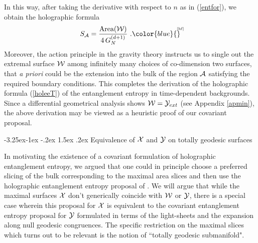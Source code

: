 \documentclass[12pt]{article}
\makeatletter
\renewcommand\subsection{\@startsection{subsection}{2}{\z@}%
                                     {-3.25ex\@plus -1ex \@minus -.2ex}%
                                     {1.5ex \@plus .2ex}%
                                     {\normalfont\bfseries}}
\newcommand{\be}{\begin{equation}}
\newcommand{\ee}{\end{equation}}
\def\req#1{(\ref{#1})}
\def\App#1{Appendix \ref{#1}}
\def\CA{{\cal A}}
\def\CW{{\cal W}}
\def\CX{{\cal X}}
\def\CY{{\cal Y}}
\def\f#1#2{{\frac{#1}{#2}}}
\def\f#1#2{{\frac{#1}{#2}}}
\def\Label#1{\label{#1}%
{ \color{blue}{\smash{\hbox to0pt{\raise2ex\hbox{\tiny[#1]}\hss}}}}}
\def\Gms{\CW}
\def\Lms{\CY}
\def\Xms{\CX}
\def\rA{\CA}
\def\f {\frac}
\makeatother
\begin{document}
In this way, after taking the derivative with respect to $n$ as in \req{entfor},
we obtain the holographic formula
%
\be
S_\rA=\f{\mbox{Area}(\Gms)}{4\,G^{(d+1)}_N} \ .
\Label{hf} \ee
%
Moreover, the action principle in the gravity theory instructs us to
single out the extremal surface $\Gms$ among infinitely many choices
of co-dimension two surfaces, that {\it a priori} could be the
extension into the bulk of the region $\rA$ satisfying the required
boundary conditions.   This completes the derivation of the
holographic formula \req{holeeT} of the entanglement entropy in
time-dependent backgrounds. Since a differential geometrical
analysis shows $\Gms = \Lms_{ext}$ (see \App{apmin}), the above
derivation may be viewed as a heuristic proof of our covariant
proposal.

\subsection{Equivalence of $\Xms$ and $\Lms$ on totally geodesic surfaces}
\label{extminmax}

In motivating the existence of a covariant formulation
of holographic entanglement entropy, we argued that one could in
principle choose a preferred slicing of the bulk corresponding to
the maximal area slices and then use the holographic entanglement
entropy proposal of \cite{Ryu:2006bv, Ryu:2006ef}. We will argue
that while the maximal surfaces $\Xms$ don't generically coincide
with $\Gms$ or $\Lms$, there is a
special case wherein this proposal for $\Xms$ is equivalent to the
covariant entanglement entropy proposal for $\Lms$ formulated in
terms of the light-sheets and the expansion along null geodesic
congruences.  The specific restriction on the maximal slices which turns out to
be relevant is the notion of ``totally geodesic submanifold".
\end{document}
